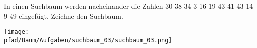 \question[3]
In einen Suchbaum werden nacheinander die Zahlen
30 38 34 3 16 19 43 41 43 14 9 49
eingefügt. Zeichne den Suchbaum.

\begin{solutionbox}{7cm}

\texttt{[image: \\pfad/Baum/Aufgaben/suchbaum\_03/suchbaum\_03.png]}
\end{solutionbox}
